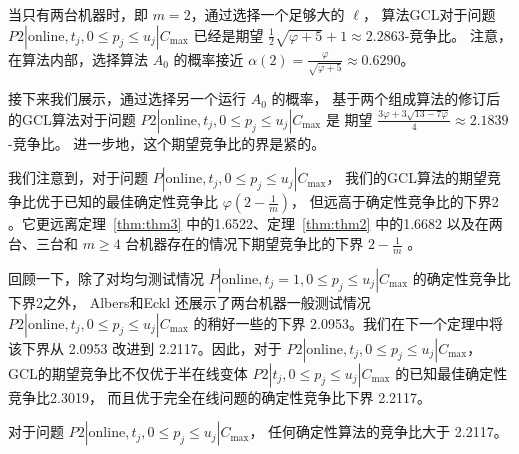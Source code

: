 当只有两台机器时，即 \( m = 2 \)，通过选择一个足够大的 \( \ell \)，
算法GCL对于问题 \( P2 | \text{online}, t_j, 0 \leq p_j \leq u_j | C_{\max} \) 
已经是期望 \( \frac{1}{2} \sqrt{\varphi + 5} + 1 \approx 2.2863 \)-竞争比。
注意，在算法内部，选择算法 \( A_0 \) 的概率接近 \( \alpha(2) = \frac{\varphi}{\sqrt{\varphi + 5}} \approx 0.6290 \)。

接下来我们展示，通过选择另一个运行 \( A_0 \) 的概率，
基于两个组成算法的修订后的GCL算法对于问题 \( P2 | \text{online}, t_j, 0 \leq p_j \leq u_j | C_{\max} \) 是
期望 \( \frac{3\varphi + 3\sqrt{13 - 7\varphi}}{4} \approx 2.1839 \)-竞争比。
进一步地，这个期望竞争比的界是紧的。

我们注意到，对于问题 \( P | \text{online}, t_j, 0 \leq p_j \leq u_j | C_{\max} \)，
我们的GCL算法的期望竞争比优于已知的最佳确定性竞争比 \( \varphi(2 - \frac{1}{m}) \)，
但远高于确定性竞争比的下界2 \cite{albers2021scheduling}。它更远离定理~\ref{thm:thm3} 中的1.6522、定理~\ref{thm:thm2} 中的1.6682
以及在两台、三台和 \( m \geq 4 \) 台机器存在的情况下期望竞争比的下界 \( 2 - \frac{1}{m} \) \cite{albers2021scheduling}。

回顾一下，除了对均匀测试情况 \( P | \text{online}, t_j = 1, 0 \leq p_j \leq u_j | C_{\max} \) 的确定性竞争比下界2之外，
Albers和Eckl \cite{albers2021scheduling} 还展示了两台机器一般测试情况 \( P2 | \text{online}, t_j, 0 \leq p_j \leq u_j | C_{\max} \) 的稍好一些的下界 2.0953。我们在下一个定理中将该下界从 2.0953 改进到 2.2117。因此，对于 \( P2 | \text{online}, t_j, 0 \leq p_j \leq u_j | C_{\max} \)，
GCL的期望竞争比不仅优于半在线变体 \( P2 | t_j, 0 \leq p_j \leq u_j | C_{\max} \) 的已知最佳确定性竞争比2.3019，
而且优于完全在线问题的确定性竞争比下界 2.2117。

\begin{thm}
    对于问题 \( P2 | \text{online}, t_j, 0 \leq p_j \leq u_j | C_{\max} \)，
    任何确定性算法的竞争比大于 2.2117。
\end{thm}

